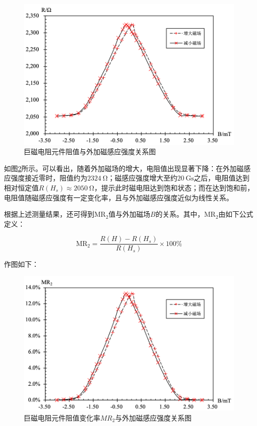 \documentclass{thuemp}
\begin{document}
\begin{figure}[H]
    \centering
    \includegraphics[width=0.8\linewidth]{../Data/GMR-Plot-01-01-excel.png}
    \caption{巨磁电阻元件阻值与外加磁感应强度关系图} \label{fig:magnetoresistance}
\end{figure}

如图\ref{fig:magnetoresistance}所示。可以看出，随着外加磁场的增大，电阻值出现显著下降：在外加磁感应强度接近零时，阻值约为$2324~\mathrm{\Omega}$；磁感应强度增大至约$20~\mathrm{Gs}$之后，电阻值达到相对恒定值$R(H_s)\approx 2050~\mathrm{\Omega}$，提示此时磁电阻达到饱和状态；而在达到饱和前，电阻值随磁感应强度有一定变化率，且与外加磁感应强度近似为线性关系。

根据上述测量结果，还可得到$\mathrm{MR_2}$值与外加磁场$B$的关系。其中，$\mathrm{MR_2}$由如下公式定义：

\begin{equation}\label{eq:mr2}
    \mathrm{MR_2} = \frac{R(H) - R(H_s)}{R(H_s)} \times 100\%
\end{equation}

作图如下：
\begin{figure}[H]
    \centering
    \includegraphics[width=0.8\linewidth]{../Data/GMR-Plot-01-02-excel.png}
    \caption{巨磁电阻元件阻值变化率$MR_2$与外加磁感应强度关系图} \label{fig:magnetoresistance}
\end{figure}
\end{document}
